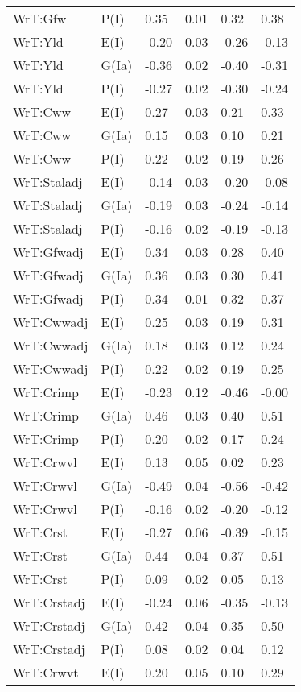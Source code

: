 \begin{center}
\begin{longtable}{|p{1.1in}|p{0.7in}|p{0.7in}|p{0.6in}|p{0.6in}|p{0.6in}|}
  WrT:Gfw & P(I) & 0.35 & 0.01 & 0.32 & 0.38 \\ 
  WrT:Yld & E(I) & -0.20 & 0.03 & -0.26 & -0.13 \\ 
  WrT:Yld & G(Ia) & -0.36 & 0.02 & -0.40 & -0.31 \\ 
  WrT:Yld & P(I) & -0.27 & 0.02 & -0.30 & -0.24 \\ 
  WrT:Cww & E(I) & 0.27 & 0.03 & 0.21 & 0.33 \\ 
  WrT:Cww & G(Ia) & 0.15 & 0.03 & 0.10 & 0.21 \\ 
  WrT:Cww & P(I) & 0.22 & 0.02 & 0.19 & 0.26 \\ 
  WrT:Staladj & E(I) & -0.14 & 0.03 & -0.20 & -0.08 \\ 
  WrT:Staladj & G(Ia) & -0.19 & 0.03 & -0.24 & -0.14 \\ 
  WrT:Staladj & P(I) & -0.16 & 0.02 & -0.19 & -0.13 \\ 
  WrT:Gfwadj & E(I) & 0.34 & 0.03 & 0.28 & 0.40 \\ 
  WrT:Gfwadj & G(Ia) & 0.36 & 0.03 & 0.30 & 0.41 \\ 
  WrT:Gfwadj & P(I) & 0.34 & 0.01 & 0.32 & 0.37 \\ 
  WrT:Cwwadj & E(I) & 0.25 & 0.03 & 0.19 & 0.31 \\ 
  WrT:Cwwadj & G(Ia) & 0.18 & 0.03 & 0.12 & 0.24 \\ 
  WrT:Cwwadj & P(I) & 0.22 & 0.02 & 0.19 & 0.25 \\ 
  WrT:Crimp & E(I) & -0.23 & 0.12 & -0.46 & -0.00 \\ 
  WrT:Crimp & G(Ia) & 0.46 & 0.03 & 0.40 & 0.51 \\ 
  WrT:Crimp & P(I) & 0.20 & 0.02 & 0.17 & 0.24 \\ 
  WrT:Crwvl & E(I) & 0.13 & 0.05 & 0.02 & 0.23 \\ 
  WrT:Crwvl & G(Ia) & -0.49 & 0.04 & -0.56 & -0.42 \\ 
  WrT:Crwvl & P(I) & -0.16 & 0.02 & -0.20 & -0.12 \\ 
  WrT:Crst & E(I) & -0.27 & 0.06 & -0.39 & -0.15 \\ 
  WrT:Crst & G(Ia) & 0.44 & 0.04 & 0.37 & 0.51 \\ 
  WrT:Crst & P(I) & 0.09 & 0.02 & 0.05 & 0.13 \\ 
  WrT:Crstadj & E(I) & -0.24 & 0.06 & -0.35 & -0.13 \\ 
  WrT:Crstadj & G(Ia) & 0.42 & 0.04 & 0.35 & 0.50 \\ 
  WrT:Crstadj & P(I) & 0.08 & 0.02 & 0.04 & 0.12 \\ 
  WrT:Crwvt & E(I) & 0.20 & 0.05 & 0.10 & 0.29 \\ 

\end{longtable}
\end{center}
